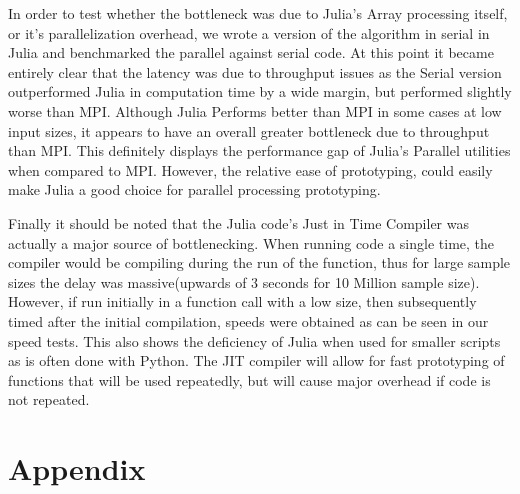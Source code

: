 \documentclass[12pt]{article}
\begin{document}
In order to test whether the bottleneck was due to Julia's Array processing itself, or it's parallelization overhead, we wrote a version of the algorithm in serial in Julia and benchmarked the parallel against serial code. At this point it became entirely clear that the latency was due to throughput issues as the Serial version outperformed Julia in computation time by a wide margin, but performed slightly worse than MPI. Although Julia Performs better than MPI in some cases at low input sizes, it appears to have an overall greater bottleneck due to throughput than MPI. This definitely displays the performance gap of Julia's Parallel utilities when compared to MPI. However, the relative ease of prototyping, could easily make Julia a good choice for parallel processing prototyping.

Finally it should be noted that the Julia code's Just in Time Compiler was actually a major source of bottlenecking. When running code a single time, the compiler would be compiling during the run of the function\cite{juliaparallelslow}, thus for large sample sizes the delay was massive(upwards of 3 seconds for 10 Million sample size). However, if run initially in a function call with a low size, then subsequently timed after the initial compilation, speeds were obtained as can be seen in our speed tests. This also shows the deficiency of Julia when used for smaller scripts as is often done with Python. The JIT compiler will allow for fast prototyping of functions that will be used repeatedly, but will cause major overhead if code is not repeated.

\appendix
\section{Appendix}
\end{document}
